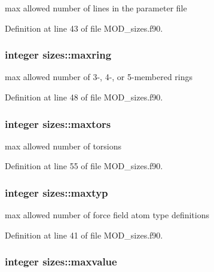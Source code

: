 max allowed number of lines in the parameter file 



Definition at line 43 of file M\-O\-D\-\_\-sizes.\-f90.

\hypertarget{classsizes_a4004c53181c49aedb70b50487047657a}{
\subsubsection[{maxring}]{\setlength{\rightskip}{0pt plus 5cm}integer sizes\-::maxring}}\label{classsizes_a4004c53181c49aedb70b50487047657a}


max allowed number of 3-\/, 4-\/, or 5-\/membered rings 



Definition at line 48 of file M\-O\-D\-\_\-sizes.\-f90.

\hypertarget{classsizes_ab541bc9c15731a59c0fc11e5fde43e25}{
\subsubsection[{maxtors}]{\setlength{\rightskip}{0pt plus 5cm}integer sizes\-::maxtors}}\label{classsizes_ab541bc9c15731a59c0fc11e5fde43e25}


max allowed number of torsions 



Definition at line 55 of file M\-O\-D\-\_\-sizes.\-f90.

\hypertarget{classsizes_a1f20629ac86c084fead34ed323f36c7b}{
\subsubsection[{maxtyp}]{\setlength{\rightskip}{0pt plus 5cm}integer sizes\-::maxtyp}}\label{classsizes_a1f20629ac86c084fead34ed323f36c7b}


max allowed number of force field atom type definitions 



Definition at line 41 of file M\-O\-D\-\_\-sizes.\-f90.

\hypertarget{classsizes_a3e950abbb75f8e27bedf94968f7baf7b}{
\subsubsection[{maxvalue}]{\setlength{\rightskip}{0pt plus 5cm}integer sizes\-::maxvalue}}\label{classsizes_a3e950abbb75f8e27bedf94968f7baf7b}


